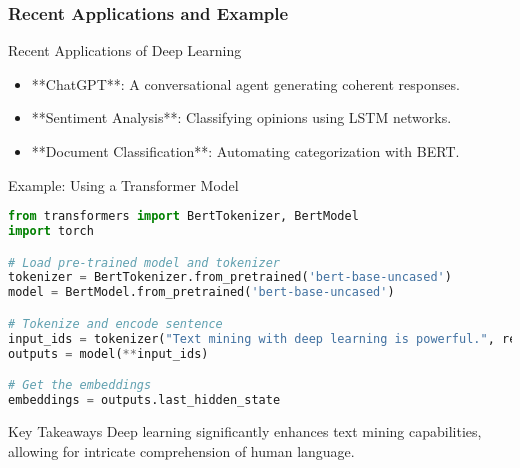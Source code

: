 \documentclass[aspectratio=169]{beamer}
\begin{document}
\begin{frame}[fragile]
    \frametitle{Recent Applications and Example}
    \begin{block}{Recent Applications of Deep Learning}
        \begin{itemize}
            \item **ChatGPT**: A conversational agent generating coherent responses.
            \item **Sentiment Analysis**: Classifying opinions using LSTM networks.
            \item **Document Classification**: Automating categorization with BERT.
        \end{itemize}
    \end{block}
    \begin{block}{Example: Using a Transformer Model}
        \begin{lstlisting}[language=Python]
from transformers import BertTokenizer, BertModel
import torch

# Load pre-trained model and tokenizer
tokenizer = BertTokenizer.from_pretrained('bert-base-uncased')
model = BertModel.from_pretrained('bert-base-uncased')

# Tokenize and encode sentence
input_ids = tokenizer("Text mining with deep learning is powerful.", return_tensors='pt')
outputs = model(**input_ids)

# Get the embeddings
embeddings = outputs.last_hidden_state
        \end{lstlisting}
    \end{block}
    \begin{block}{Key Takeaways}
        Deep learning significantly enhances text mining capabilities, allowing for intricate comprehension of human language.
    \end{block}
\end{frame}
\end{document}
